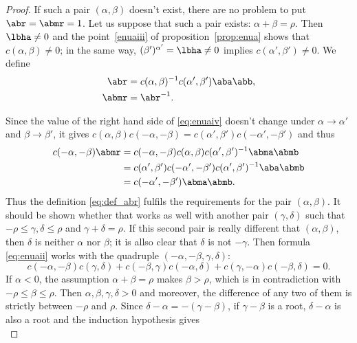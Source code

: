 \begin{proof}
If such a pair $(\alpha,\beta)$ doesn't exist, there are no problem to put $\abr=\abmr=1$. Let us suppose that such a pair exists: $\alpha+\beta=\rho$. Then $\lbha\neq 0$ and the point~\ref{enuaiii} of proposition~\ref{prop:enua} shows that $c(\alpha,\beta)\neq 0$; in the same way, $(\beta')^{\alpha'}=\lbha\neq 0$ implies $c(\alpha',\beta')\neq 0$. We define
\begin{subequations}\label{eq:def_abr}
\begin{align}
\abr&=c(\alpha,\beta)^{-1} c(\alpha',\beta')\aba\abb,\\
\abmr&=\abr^{-1}.
\end{align}
\end{subequations}


Since the value of the right hand side of \eqref{eq:enuaiv} doesn't change under $\alpha\to\alpha'$ and $\beta\to\beta'$, it gives  $c(\alpha,\beta)c(-\alpha,-\beta)=c(\alpha',\beta')c(-\alpha',-\beta')$ and thus
\begin{equation}
\begin{split}
c(-\alpha,-\beta)\abmr&=c(-\alpha,-\beta)c(\alpha,\beta)c(\alpha',\beta')^{-1}\abma\abmb\\
&=c(\alpha',\beta')c(-\alpha',-\beta')c(\alpha',\beta')^{-1}\aba\abmb\\
&=c(-\alpha',-\beta')\abma\abmb.
\end{split}
\end{equation}
Thus the definition \eqref{eq:def_abr} fulfils the requirements for the pair $(\alpha,\beta)$. It should be shown whether that works as well with another pair $(\gamma,\delta)$ such that $-\rho\leq\gamma,\delta\leq\rho$ and $\gamma+\delta=\rho$. If this second pair is really different that $(\alpha,\beta)$, then $\delta$ is neither $\alpha$ nor $\beta$; it is allso clear that $\delta$ is not $-\gamma$. Then formula \eqref{eq:enuaii}  works with the quadruple $(-\alpha,-\beta,\gamma,\delta)$:
\begin{equation}\label{eq:c_un}
c(-\alpha,-\beta)c(\gamma,\delta)+c(-\beta,\gamma)c(-\alpha,\delta)+c(\gamma,-\alpha)c(-\beta,\delta)=0.
\end{equation}
If $\alpha<0$, the assumption $\alpha+\beta=\rho$ makes $\beta>\rho$, which is in contradiction with $-\rho\leq\beta\leq\rho$. Then $\alpha,\beta,\gamma,\delta>0$ and moreover, the difference of any two of them is strictly between $-\rho$ and $\rho$. Since $\delta-\alpha=-(\gamma-\beta)$, if $\gamma-\beta$ is a root, $\delta-\alpha$ is also a root and the induction hypothesis gives
\begin{subequations}\label{eq:c_deux_un}

\end{subequations}
\end{proof}
